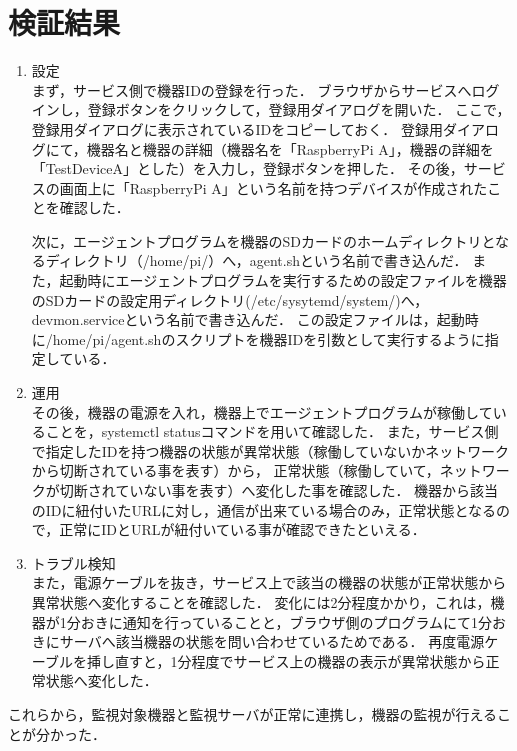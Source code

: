 \section{検証結果}
\begin{enumerate}
\item 設定\\
まず，サービス側で機器IDの登録を行った．
ブラウザからサービスへログインし，登録ボタンをクリックして，登録用ダイアログを開いた．
ここで，登録用ダイアログに表示されているIDをコピーしておく．
登録用ダイアログにて，機器名と機器の詳細（機器名を「RaspberryPi A」，機器の詳細を「TestDeviceA」とした）を入力し，登録ボタンを押した．
その後，サービスの画面上に「RaspberryPi A」という名前を持つデバイスが作成されたことを確認した．

次に，エージェントプログラムを機器のSDカードのホームディレクトリとなるディレクトリ（/home/pi/）へ，agent.shという名前で書き込んだ．
また，起動時にエージェントプログラムを実行するための設定ファイルを機器のSDカードの設定用ディレクトリ(/etc/sysytemd/system/)へ，devmon.serviceという名前で書き込んだ．
この設定ファイルは，起動時に/home/pi/agent.shのスクリプトを機器IDを引数として実行するように指定している．

\item 運用\\
その後，機器の電源を入れ，機器上でエージェントプログラムが稼働していることを，systemctl statusコマンドを用いて確認した．
また，サービス側で指定したIDを持つ機器の状態が異常状態（稼働していないかネットワークから切断されている事を表す）から，
正常状態（稼働していて，ネットワークが切断されていない事を表す）へ変化した事を確認した．
機器から該当のIDに紐付いたURLに対し，通信が出来ている場合のみ，正常状態となるので，正常にIDとURLが紐付いている事が確認できたといえる．

\item トラブル検知\\
また，電源ケーブルを抜き，サービス上で該当の機器の状態が正常状態から異常状態へ変化することを確認した．
変化には2分程度かかり，これは，機器が1分おきに通知を行っていることと，ブラウザ側のプログラムにて1分おきにサーバへ該当機器の状態を問い合わせているためである．
再度電源ケーブルを挿し直すと，1分程度でサービス上の機器の表示が異常状態から正常状態へ変化した．
\end{enumerate}

これらから，監視対象機器と監視サーバが正常に連携し，機器の監視が行えることが分かった．







